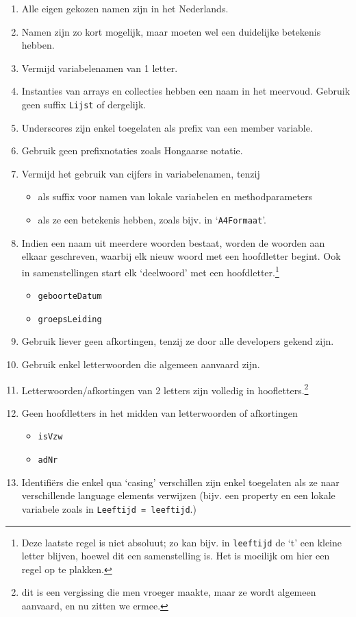 \documentclass[a4paper,11pt]{article}
\begin{document}
\begin{enumerate}[resume]
\item Alle eigen gekozen namen zijn in het Nederlands. 
\item Namen zijn zo kort mogelijk, maar moeten wel een duidelijke
betekenis hebben.
\item Vermijd variabelenamen van 1 letter.
\item Instanties van arrays en collecties hebben een naam in het meervoud.  Gebruik geen
suffix \lstinline !Lijst! of dergelijk.
\item Underscores zijn enkel toegelaten als prefix van een member
variable.
\item Gebruik geen prefixnotaties zoals Hongaarse notatie.
\item Vermijd het gebruik van cijfers in variabelenamen, tenzij
\begin{itemize}
\item als suffix voor namen van lokale variabelen
en methodparameters
\item als ze een betekenis hebben, zoals bijv. in `\lstinline !A4Formaat!'.
\end{itemize}
\item Indien een naam uit meerdere woorden bestaat, worden de woorden aan elkaar geschreven,
waarbij elk nieuw woord met een hoofdletter begint.  Ook in samenstellingen start elk
`deelwoord' met een hoofdletter.\footnote{Deze laatste regel is niet absoluut; zo kan bijv. in
\lstinline !leeftijd! de `t' een kleine letter blijven, hoewel dit een samenstelling is.  Het is moeilijk om hier een regel op te
plakken.}
\begin{itemize}
\item \lstinline !geboorteDatum!
\item \lstinline !groepsLeiding!
\end{itemize}
\item Gebruik liever geen afkortingen, tenzij ze door alle developers
gekend zijn.
\item Gebruik enkel letterwoorden die algemeen aanvaard zijn.
\item Letterwoorden/afkortingen van 2 letters zijn volledig in hoofletters.\footnote{dit is een
vergissing die men vroeger maakte, maar ze wordt algemeen aanvaard, en nu zitten we ermee.}
\item Geen hoofdletters in het midden van letterwoorden of afkortingen
\begin{itemize}
\item \lstinline !isVzw!
\item \lstinline !adNr!
\end{itemize}
\item Identifi\"ers die enkel qua `casing' verschillen zijn enkel
toegelaten als ze naar verschillende language elements verwijzen (bijv.
een property en een lokale variabele zoals in 
\lstinline !Leeftijd = leeftijd!.)
\end{enumerate}
\end{document}
